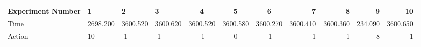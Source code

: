 \documentclass[8pt]{article}
\begin{document}
\begin{landscape}
\begin{tabular}{ | l | l | l | l | c | c | c | r | r | r | r | }
 \hline 
Experiment Number & 1 & 2 & 3 & 4 & 5 & 6 & 7 & 8 & 9 & 10\\ \hline
Time & 2698.200 & 3600.520 & 3600.620 & 3600.520 & 3600.580 & 3600.270 & 3600.410 & 3600.360 & 234.090 & 3600.650\\ \hline
Action & 10 & -1 & -1 & -1 & 0 & -1 & -1 & -1 & 8 & -1\\ \hline\end{tabular}
\end{landscape}
\end{document}
